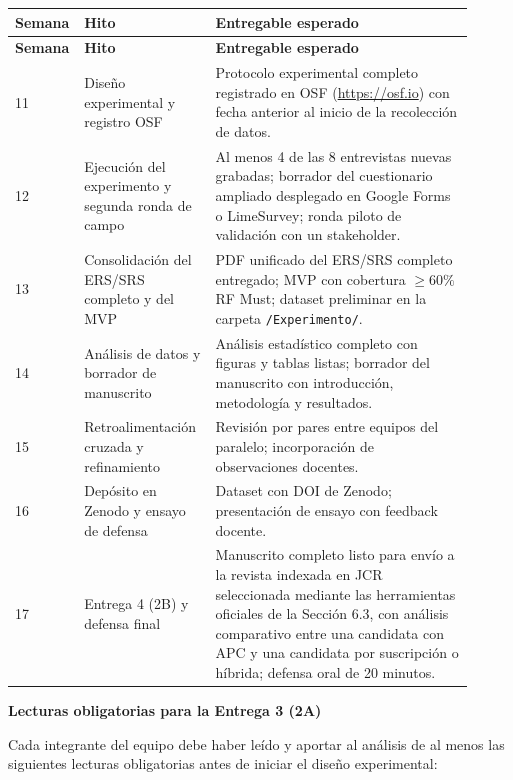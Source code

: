 \documentclass[11pt,a4paper]{article}
\newcounter{secc}
\newcommand{\secband}[1]{%
    \stepcounter{secc}\par\vspace{9pt}\noindent
    {\setlength{\fboxsep}{0pt}%
        \colorbox{uteqgold}{\parbox[c][20pt][c]{0.05\textwidth}{\centering\textbf{\color{white}\small \arabic{secc}}}}%
        \colorbox{uteqgreen}{\parbox[c][20pt][c]{0.95\textwidth}{\hspace{8pt}\textbf{\color{white}\small #1}}}%
    }\par\vspace{5pt}}
\newcommand{\hh}[1]{\cellcolor{uteqgreen}\textbf{\color{white}\small #1}}
\begin{document}
\begin{longtable}{@{}p{0.08\linewidth} p{0.28\linewidth} p{0.55\linewidth}@{}}
    \hh{Semana} & \hh{Hito} & \hh{Entregable esperado}\\
    \endfirsthead
    \hh{Semana} & \hh{Hito} & \hh{Entregable esperado}\\
    \endhead
    11 & Diseño experimental y registro OSF & Protocolo experimental completo registrado en OSF (\url{https://osf.io}) con fecha anterior al inicio de la recolección de datos.\\
    12 & Ejecución del experimento y segunda ronda de campo & Al menos 4 de las 8 entrevistas nuevas grabadas; borrador del cuestionario ampliado desplegado en Google Forms o LimeSurvey; ronda piloto de validación con un stakeholder.\\
    13 & Consolidación del ERS/SRS completo y del MVP & PDF unificado del ERS/SRS completo entregado; MVP con cobertura $\geq 60\%$ RF Must; dataset preliminar en la carpeta \texttt{/Experimento/}.\\
    14 & Análisis de datos y borrador de manuscrito & Análisis estadístico completo con figuras y tablas listas; borrador del manuscrito con introducción, metodología y resultados.\\
    15 & Retroalimentación cruzada y refinamiento & Revisión por pares entre equipos del paralelo; incorporación de observaciones docentes.\\
    16 & Depósito en Zenodo y ensayo de defensa & Dataset con DOI de Zenodo; presentación de ensayo con feedback docente.\\
    17 & Entrega 4 (2B) y defensa final & Manuscrito completo listo para envío a la revista indexada en JCR seleccionada mediante las herramientas oficiales de la Sección 6.3, con análisis comparativo entre una candidata con APC y una candidata por suscripción o híbrida; defensa oral de 20 minutos.\\
\end{longtable}

\secband{Lecturas obligatorias para la Entrega 3 (2A)}

Cada integrante del equipo debe haber leído y aportar al análisis de al menos las siguientes lecturas obligatorias antes de iniciar el diseño experimental:
\end{document}
